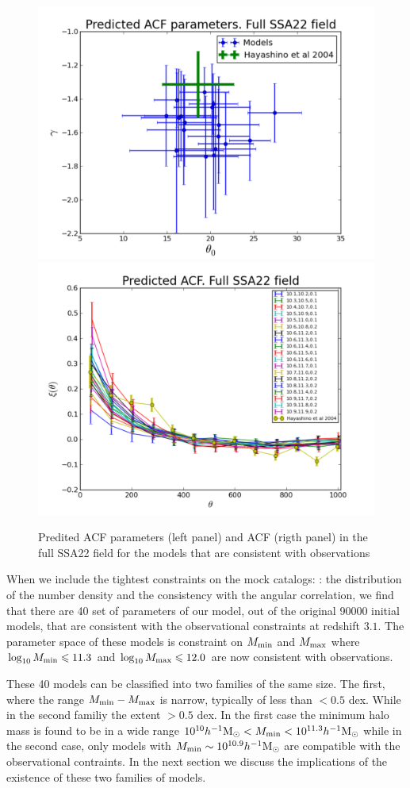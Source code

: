 \documentclass[usenatbib]{mn2e}
\newcommand{\hMsun}{{\ifmmode{h^{-1}{\rm {M_{\odot}}}}\else{$h^{-1}{\rm{M_{\odot}}}$}\fi}}
\begin{document}
\begin{figure}
\begin{center}
\includegraphics[width=0.49\linewidth,angle=0]{./plots/power_law_correlation_prediction.pdf}
\includegraphics[width=0.49\linewidth,angle=0]{./plots/mean_correlation_prediction.pdf}
\end{center}
\caption{Predited ACF parameters (left panel) and ACF (rigth panel) in the full SSA22
field for the models that are consistent with observations \label{fig:ACF_prediction}} 
\end{figure} 


When we include the tightest constraints on the mock catalogs: : the
distribution of the number density and the  consistency with 
the angular correlation, we find
that there are 40 set of parameters of our model, out of the original
90000 initial models, that are consistent with the observational
constraints at redshift $3.1$. The parameter space of these models
is constraint on $M_{\rm min}$ and $M_{\rm max}$ where
$\log_{10}M_{\rm min}\leq 11.3$ and $\log_{10}M_{\rm max}\leq 12.0$ 
are now consistent with observations.

These 40 models can be classified into two families of the same
size. The first, where the range $M_{\rm min}-M_{\rm max}$ is narrow,
typically of less than $<0.5$ dex. While in the second familiy the
extent $>0.5$ dex. In the first case the minimum halo mass is found to
be in a wide range $10^{10}\hMsun <M_{\rm min}< 10^{11.3}\hMsun$ while
in the second case, only models with $M_{\rm min}\sim 10^{10.9}\hMsun$
are compatible with the observational contraints. In the next section we
discuss the implications of the existence of these two families of
models.  
\end{document}
